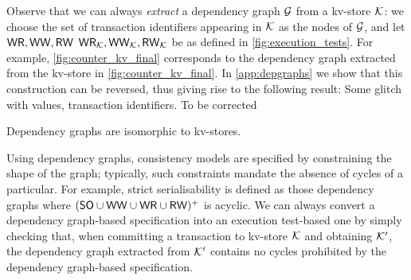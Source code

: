 %
Observe that we can always \emph{extract} a dependency graph  $\mathcal{G}$ from a kv-store $\mathcal{K}$:
we choose the set of transaction identifiers appearing in $\mathcal{K}$ as the nodes of $\mathcal{G}$, 
and let $\mathsf{WR}, \mathsf{WW}, \mathsf{RW}$  $\mathsf{WR}_{\mathcal{K}}, \mathsf{WW}_{\mathcal{K}}, \mathsf{RW}_{\mathcal{K}}$ be as defined in \cref{fig:execution_tests}.
For example, \cref{fig:counter_kv_final} corresponds to the dependency graph extracted from the kv-store in \cref{fig:counter_kv_final}.
In \cref{app:depgraphs} we show that this construction can be reversed, thus giving 
rise to the following result: 
%
\ac{Some glitch with values, transaction identifiers. To be corrected} 
\begin{theorem}
\label{thm:kv_graph_isomorph}
Dependency graphs are isomorphic to kv-stores.
\end{theorem}

Using dependency graphs, consistency models are specified by constraining the shape of the graph; typically, such constraints mandate the absence of cycles of a particular. For example, strict serialisability is defined as those dependency graphs where $(\mathsf{SO} \cup \mathsf{WW} \cup \mathsf{WR} \cup \mathsf{RW})^+$ is acyclic. 
We can always convert a dependency graph-based specification into an execution test-based one by simply checking that, when committing a transaction to kv-store $\mathcal{K}$ and obtaining $\mathcal{K}'$, 
the dependency graph extracted from $\mathcal{K}'$ contains no cycles prohibited by the dependency graph-based specification. 



